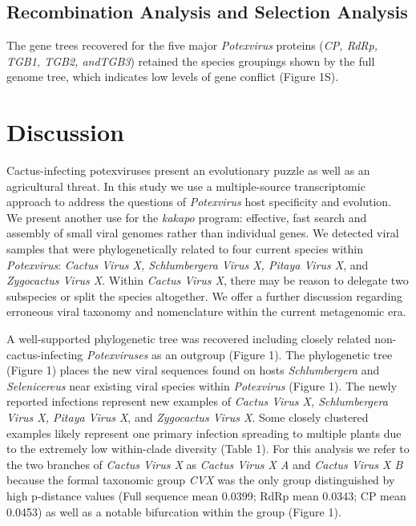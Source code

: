 \documentclass[fleqn,10pt,lineno]{wlpeerj}
\begin{document}
\subsection*{Recombination Analysis and Selection Analysis}
The gene trees recovered for the five major \textit{Potexvirus} proteins (\textit{CP, RdRp, TGB1, TGB2, \textit{and}TGB3}) retained the species groupings shown by the full genome tree, which indicates low levels of gene conflict (Figure 1S).


\section*{Discussion}
Cactus-infecting potexviruses present an evolutionary puzzle as well as an agricultural threat. 
In this study we use a multiple-source transcriptomic approach to address the questions of \textit{Potexvirus} host specificity and evolution. 
We present another use for the \textit{kakapo} program: effective, fast search and assembly of small viral genomes rather than individual genes. 
We detected viral samples that were phylogenetically related to four current species within \textit{Potexvirus}: \textit{Cactus Virus X, Schlumbergera Virus X, Pitaya Virus X}, and \textit{Zygocactus Virus X}. 
Within \textit{Cactus Virus X}, there may be reason to delegate two subspecies or split the species altogether. 
We offer a further discussion regarding erroneous viral taxonomy and nomenclature within the current metagenomic era.

A well-supported phylogenetic tree was recovered including closely related non-cactus-infecting \textit{Potexviruses} as an outgroup (Figure 1).
The phylogenetic tree (Figure 1) places the new viral sequences found on hosts \textit{Schlumbergera} and \textit{Selenicereus} near existing viral species within \textit{Potexvirus} (Figure 1). 
The newly reported infections represent new examples of \textit{Cactus Virus X, Schlumbergera Virus X, Pitaya Virus X}, and \textit{Zygocactus Virus X}.
Some closely clustered examples likely represent one primary infection spreading to multiple plants due to the extremely low within-clade diversity (Table 1).
For this analysis we refer to the two branches of\textit{ Cactus Virus X }as \textit{Cactus Virus X A} and \textit{Cactus Virus X B} because the formal taxonomic group \textit{CVX} was the only group distinguished by high p-distance values (Full sequence mean 0.0399; RdRp mean 0.0343; CP mean 0.0453) as well as a notable bifurcation within the group (Figure 1).
\end{document}
